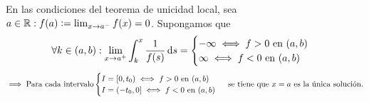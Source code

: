 \begin{cor}
    En las condiciones del teorema de unicidad local, sea $a\in \mathbb{R} : f(a)\vcentcolon= \lim_{x\to a^-} f(x)=0$. Supongamos que
    \[\forall k \in (a,b) : \lim_{x\to a^+}\int_{k}^{x} \frac{1}{f(s)} \odif{s} = \begin{cases}
        -\infty \iff f>0 \tex{ en } (a,b) \\
        \infty \iff f<0 \tex{ en } (a,b)
    \end{cases}\]
    \[\implies \text{Para cada intervalo} \begin{cases}
        I=[0, t_0) \iff f>0 \text{ en } (a,b) \\
        I=(-t_0, 0] \iff f<0 \text{ en } (a,b)
    \end{cases} \text{ se tiene que $x=a$ es la única solución.}\]
\end{cor}


